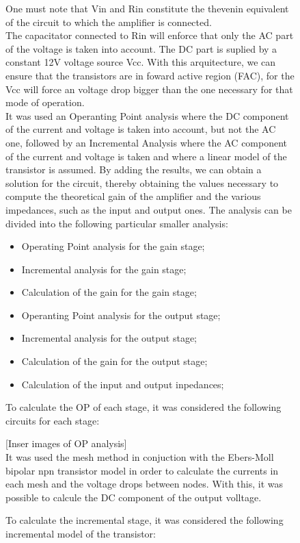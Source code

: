 \begin{figure} [!htb]
One must note that Vin and Rin constitute the thevenin equivalent of the circuit to which the amplifier is connected.\\
The capacitator connected to Rin will enforce that only the AC part of the voltage is taken into account. The DC part is suplied by a constant 12V voltage source Vcc. With this arquitecture, we can ensure that the transistors are in foward active region (FAC), for the Vcc will force an voltage drop bigger than the one necessary for that mode of operation.\\
It was used an Operanting Point analysis where the DC component of the current and voltage is taken into account, but not the AC one, followed by an Incremental Analysis where the AC component of the current and voltage is taken and where a linear model of the transistor is assumed. By adding the results, we can obtain a solution for the circuit, thereby obtaining the values necessary to compute the theoretical gain of the amplifier and the various impedances, such as the input and output ones.
The analysis can be divided into the following particular smaller analysis:
\begin{itemize}
	\item Operating Point analysis for the gain stage;
	\item Incremental analysis for the gain stage;
	\item Calculation of the gain for the gain stage;
	\item Operanting Point analysis for the output stage;
	\item Incremental analysis for the output stage;
	\item Calculation of the gain for the output stage;
	\item Calculation of the input and output inpedances;
\end{itemize}

To calculate the OP of each stage, it was considered the following circuits for each stage:

[Inser images of OP analysis]\\


It was used the mesh method in conjuction with the Ebers-Moll bipolar npn transistor model in order to calculate the currents in each mesh and the voltage drops between nodes. With this, it was possible to calcule the DC component of the output volltage.\

To calculate the incremental stage, it was considered the following incremental model of the transistor:\\



\end{figure}

